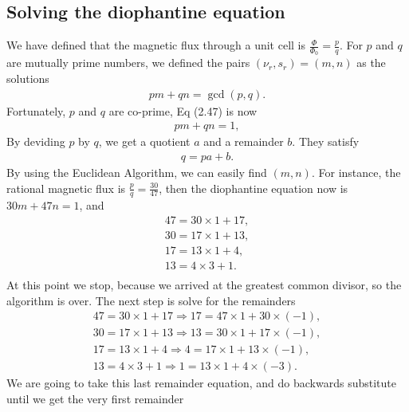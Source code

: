 \documentclass{report}
\begin{document}
\subsection{Solving the diophantine equation}
We have defined that the magnetic flux through a unit cell is $\frac{\Phi}{\Phi_{0}} = \frac{p}{q}$. For $p$ and $q$ are mutually prime numbers, we defined the pairs $(\nu_{r},s_{r})=(m,n)$ as the solutions
\begin{gather}
	p m + q n  = \gcd(p,q).
\end{gather}
Fortunately, $p$ and $q$ are co-prime, Eq (2.47) is now
\begin{gather}
	pm + qn = 1,
\end{gather}
By deviding $p$ by $q$, we get a quotient $a$ and a remainder $b$. They satisfy
\begin{gather}
	q = p a + b.
\end{gather}
By using the Euclidean Algorithm, we can easily find $(m,n)$. For instance, the rational magnetic flux is $\frac{p}{q} = \frac{30}{47}$, then the diophantine equation now is $30m + 47n = 1$, and
\begin{equation}
	\begin{aligned}
		47 = 30 \times 1 + 17, \\
		30 = 17 \times 1 + 13, \\
		17 = 13 \times 1 + 4,  \\
		13 = 4 \times 3 + 1.   \\
	\end{aligned}
\end{equation}
At this point we stop, because we arrived at the greatest common divisor, so the algorithm is over. The next step is solve for the remainders
\begin{equation}
	\begin{aligned}
		47 = 30 \times 1 + 17 \Rightarrow 17 = 47 \times 1 + 30 \times (-1), \\
		30 = 17 \times 1 + 13 \Rightarrow 13 = 30 \times 1 + 17 \times (-1), \\
		17 = 13 \times 1 + 4 \Rightarrow 4 = 17 \times 1 + 13 \times (-1),   \\
		13 = 4 \times 3 + 1 \Rightarrow 1 = 13 \times 1 + 4 \times (-3).
	\end{aligned}
\end{equation}
We are going to take this last remainder equation, and do backwards substitute until we get the very first remainder
\end{document}
